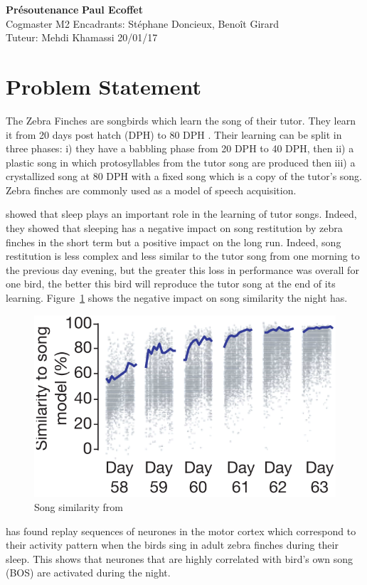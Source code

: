 \documentclass[a4paper, 11pt]{article}
\begin{document}
\noindent
\large\textbf{Présoutenance} \hfill \textbf{Paul Ecoffet} \\
\normalsize Cogmaster M2 \hfill Encadrants: Stéphane Doncieux, Benoît Girard \\
Tuteur: Mehdi Khamassi \hfill 20/01/17

\section*{Problem Statement}

The Zebra Finches are songbirds which learn the song of their tutor. They learn
it from 20 days post hatch (DPH) to 80 DPH \parencite{liu_juvenile_2004}. Their
learning can be split in three phases: i) they have a babbling phase from 20 DPH
to 40 DPH, then ii) a plastic song in which protosyllables from the tutor song
are produced then iii) a crystallized song at 80 DPH with a fixed song which is
a copy of the tutor's song. Zebra finches are commonly used as a model of speech
acquisition.

\textcite{deregnaucourt_how_2005} showed that sleep plays an important role in
the learning of tutor songs. Indeed, they showed that sleeping has a negative
impact on song restitution by zebra finches in the short term but a positive
impact on the long run. Indeed, song restitution is less complex and less
similar to the tutor song from one morning to the previous day evening, but the
greater this loss in performance was overall for one bird, the better this bird
will reproduce the tutor song at the end of its learning.
Figure~\ref{fig:sleep_performance} shows the negative impact on song similarity
the night has.

\begin{figure}[b]
  \center
  \includegraphics[width=0.5\linewidth]{media/deregnaucourt_sleep_performance.png}
  \caption{Song similarity from \textcite{deregnaucourt_how_2005}}
  \label{fig:sleep_performance}
\end{figure}

\textcite{dave_song_2000} has found replay sequences of neurones in the motor
cortex which correspond to their activity pattern when the birds sing in adult
zebra finches during their sleep. This shows that neurones that are highly
correlated with bird's own song (BOS) are activated during the night.
\end{document}
